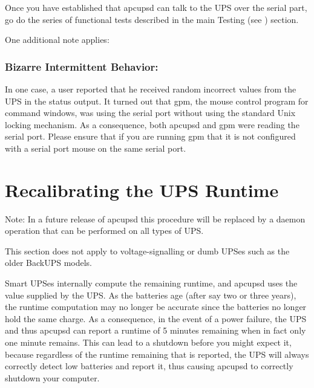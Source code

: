 {{{{{{{\label{index-Testing-230}
Once you have established that apcupsd can talk to the UPS over the serial
part, go do the series of functional tests described in the main Testing (see 
) section.  

One additional note applies: 

\label{Bizarre-Intermittent-Behavior}

\subsubsection*{Bizarre Intermittent Behavior:}

In one case, a user reported that he received random incorrect values from the
UPS in the status output. It turned out that gpm, the mouse control program
for command windows, was using the serial port without using the standard Unix
locking mechanism. As a consequence, both apcupsd and gpm were reading the
serial port. Please ensure that if you are running gpm that it is not
configured with a serial port mouse on the same serial port. 

\label{Recalibrating-the-UPS-Runtime}

\section*{Recalibrating the UPS Runtime}

\label{index-Runtime-recalibration-231}
\label{index-Recalibration-Runtime-232}
Note: In a future release of apcupsd this procedure will be replaced by a
daemon operation that can be performed on all types of UPS.  

This section does not apply to voltage-signalling or dumb UPSes such as the
older BackUPS models.  

Smart UPSes internally compute the remaining runtime, and apcupsd uses the
value supplied by the UPS. As the batteries age (after say two or three
years), the runtime computation may no longer be accurate since the batteries
no longer hold the same charge. As a consequence, in the event of a power
failure, the UPS and thus apcupsd can report a runtime of 5 minutes remaining
when in fact only one minute remains. This can lead to a shutdown before you
might expect it, because regardless of the runtime remaining that is reported,
the UPS will always correctly detect low batteries and report it, thus causing
apcupsd to correctly shutdown your computer.  

}}}}}}}
